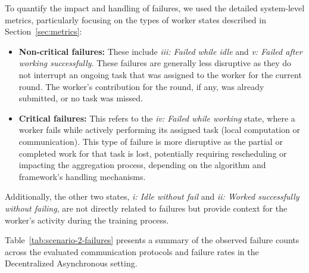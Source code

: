 To quantify the impact and handling of failures, we used the detailed system-level metrics, particularly focusing on the types of worker states described in Section~\ref{sec:metrics}:

\begin{itemize}
    \item \textbf{Non-critical failures:} These include \textit{iii: Failed while idle} and \textit{v: Failed after working successfully}. These failures are generally less disruptive as they do not interrupt an ongoing task that was assigned to the worker for the current round. The worker's contribution for the round, if any, was already submitted, or no task was missed.
    \item \textbf{Critical failures:} This refers to the \textit{iv: Failed while working} state, where a worker fails while actively performing its assigned task (local computation or communication). This type of failure is more disruptive as the partial or completed work for that task is lost, potentially requiring rescheduling or impacting the aggregation process, depending on the algorithm and framework's handling mechanisms.
\end{itemize}

Additionally, the other two states, \textit{i: Idle without fail} and \textit{ii: Worked successfully without failing}, are not directly related to failures but provide context for the worker's activity during the training process.

Table~\ref{tab:scenario-2-failures} presents a summary of the observed failure counts across the evaluated communication protocols and failure rates in the Decentralized Asynchronous setting.

